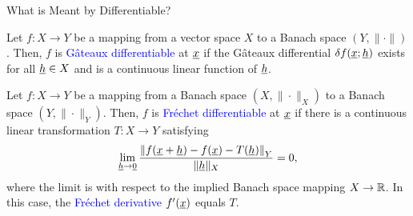\documentclass[10pt,letterpaper,english]{beamer}
\begin{document}
\begin{frame}{What is Meant by Differentiable?}

\begin{definition}
Let $f \colon X \rightarrow Y$ be a mapping from a vector space $X$ to a Banach space $(Y,\|\cdot\|)$.
Then, $f$ is \textcolor{blue}{G\^{a}teaux differentiable} at $\underline{x}$ if the G\^{a}teaux differential $\delta f (\underline{x};\underline{h})$ exists for all $\underline{h} \in X$ and is a continuous linear function of $\underline{h}$.
\end{definition}

\begin{definition}[Differentiable]
Let $f \colon X \rightarrow Y$ be a mapping from a Banach space $(X,\|\cdot\|_X)$ to a Banach space $(Y,\|\cdot\|_Y)$.
Then, $f$ is \textcolor{blue}{Fr\'{e}chet differentiable} at $\underline{x}$ if there is a continuous linear transformation $T\colon X \to Y$ satisfying
\begin{equation*} \lim_{\underline{h} \to \underline{0}} \frac{\left\|f(\underline{x}+ \underline{h}) - f(\underline{x}) - T(\underline{h}) \right\|_Y}{\| \underline{h} \|_X} = 0,
\end{equation*}
where the limit is with respect to the implied Banach space mapping $X\to \mathbb{R}$.
In this case, the \textcolor{blue}{Fr\'{e}chet derivative} $f'(\underline{x})$ equals $T$.
\end{definition}
\end{frame}
\end{document}
